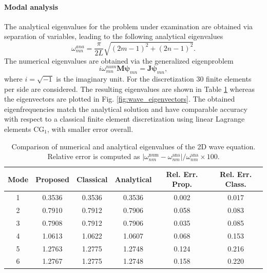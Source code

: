 \documentclass[11pt,a4paper]{article}
\begin{document}
\paragraph{Modal analysis}
The analytical eigenvalues for the problem under examination are obtained via separation of variables, leading to the following analytical eigenvalues 
$$
\omega_{mn}^{ana} = \frac{\pi}{2 L}\sqrt{(2m-1)^2 + (2n-1)^2}.
$$
The numerical eigenvalues are obtained via the generalized eigenproblem
$$
i \omega_{mn}^{num} \mathbf{M}\bm{\psi}_{mn} = \mathbf{J}\bm{\psi}_{mn},
$$
where $i= \sqrt{-1}$ is the imaginary unit.
For the discretization $30$ finite elements per side are considered. The resulting eigenvalues are shown in Table \ref{tab:eigenvalues_wave} whereas the eigenvectors are plotted in Fig. \ref{fig:wave_eigenvectors}. The obtained eigenfrequencies match the analytical solution and have comparable accuracy with respect to a classical finite element discretization using linear Lagrange elements CG$_1$, with smaller error overall.
\begin{table}[htb]
\centering
\begin{tabular}{c c c c c c}
\hline
Mode 
& Proposed 
& Classical 
& Analytical
& Rel. Err. Prop. 
& Rel. Err. Class. \\
\hline
1  & 0.3536 & 0.3536 & 0.3536 & 0.002 & 0.017 \\
2  & 0.7910 & 0.7912 & 0.7906 & 0.058 & 0.083 \\
3  & 0.7908 & 0.7912 & 0.7906 & 0.035 & 0.085 \\
4  & 1.0613 & 1.0622 & 1.0607 & 0.068 & 0.153 \\
5  & 1.2763 & 1.2775 & 1.2748 & 0.124 & 0.216 \\
6  & 1.2767 & 1.2775 & 1.2748 & 0.158 & 0.220 \\
\hline
\end{tabular}
\caption{Comparison of numerical and analytical eigenvalues of the 2D wave equation. Relative error is computed as $|\omega_{nm}^{\text{num}} - \omega_{nm}^{\text{ana}}|/{\omega_{nm}^{\text{ana}}} \times 100$.}
\label{tab:eigenvalues_wave}
\end{table}
\end{document}
